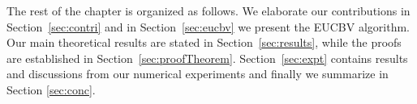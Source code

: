     The rest of the chapter is organized as follows. We elaborate our contributions in Section~\ref{sec:contri} and in Section~\ref{sec:eucbv} we present the  EUCBV algorithm. Our main theoretical results are stated in Section~\ref{sec:results}, while the proofs are established in Section~\ref{sec:proofTheorem}. Section~\ref{sec:expt} contains results and discussions from our numerical experiments and finally we summarize in Section \ref{sec:conc}.
    
